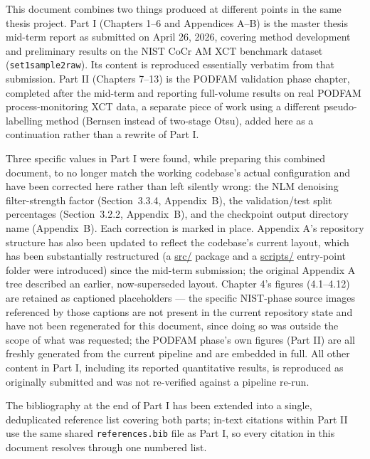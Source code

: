 
This document combines two things produced at different points in the same thesis project.
Part I (Chapters 1--6 and Appendices A--B) is the master thesis mid-term report as submitted on
April 26, 2026, covering method development and preliminary results on the NIST CoCr AM XCT
benchmark dataset (\texttt{set1sample2raw}). Its content is reproduced essentially verbatim from that
submission. Part II (Chapters 7--13) is the PODFAM validation phase chapter, completed after the
mid-term and reporting full-volume results on real PODFAM process-monitoring XCT data, a separate
piece of work using a different pseudo-labelling method (Bernsen instead of two-stage Otsu), added
here as a continuation rather than a rewrite of Part I.

Three specific values in Part I were found, while preparing this combined document, to no longer
match the working codebase's actual configuration and have been corrected here rather than left
silently wrong: the NLM denoising filter-strength factor (Section~3.3.4, Appendix~B), the
validation/test split percentages (Section~3.2.2, Appendix~B), and the checkpoint output directory
name (Appendix~B). Each correction is marked in place. Appendix A's repository structure has also
been updated to reflect the codebase's current layout, which has been substantially restructured
(a \url{src/} package and a \url{scripts/} entry-point folder were introduced) since the
mid-term submission; the original Appendix A tree described an earlier, now-superseded layout.
Chapter 4's figures (4.1--4.12) are retained as captioned placeholders --- the specific NIST-phase
source images referenced by those captions are not present in the current repository state and have
not been regenerated for this document, since doing so was outside the scope of what was requested;
the PODFAM phase's own figures (Part II) are all freshly generated from the current pipeline and are
embedded in full. All other content in Part I, including its reported quantitative results, is
reproduced as originally submitted and was not re-verified against a pipeline re-run.

The bibliography at the end of Part I has been extended into a single, deduplicated reference list
covering both parts; in-text citations within Part II use the same shared \texttt{references.bib}
file as Part I, so every citation in this document resolves through one numbered list.

